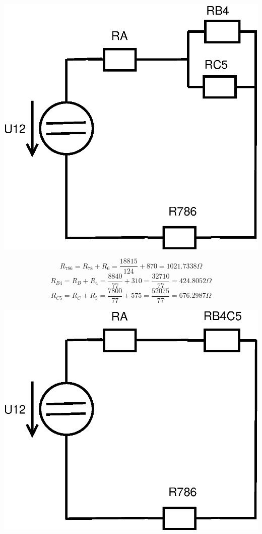 \documentclass[a4paper, 12pt]{article}
\begin{document}
\includegraphics[scale=0.4]{pr1/Diagram3.eps}

$$ R_{786} = R_{78} + R_6 = \frac{18815}{124} + 870 = 1021.7338 \Omega $$
\vspace{1mm}
$$ R_{B4} = R_B + R_4 = \frac{8840}{77} + 310 = \frac{32710}{77} = 424.8052 \Omega $$
\vspace{1mm}
$$ R_{C5} = R_C + R_5 = \frac{7800}{77} + 575 = \frac{52075}{77} = 676.2987 \Omega $$
\vspace{1mm}

\includegraphics[scale=0.4]{pr1/Diagram4.eps}
\end{document}
